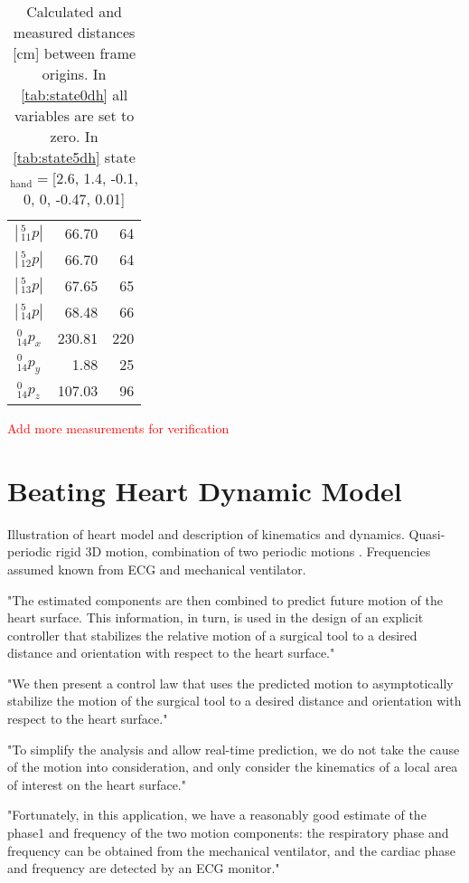 \begin{table}[htbp]
{\begin{tabular}{l r r}
		$|\,^5_{11} p|$ & 66.70 & 64\\
		$|\,^5_{12} p|$ & 66.70 & 64\\
		$|\,^5_{13} p|$ & 67.65 & 65\\
		$|\,^5_{14} p|$ & 68.48 & 66\\\hline
		$\,^0_{14} p_x$ & 230.81 & 220\\
		$\,^0_{14} p_y$ & 1.88 & 25\\
		$\,^0_{14} p_z$ & 107.03 & 96
	\end{tabular}
	\label{tab:state6dh}%
}\hfill
\caption{Calculated and measured distances [cm] between frame origins. In \autoref{tab:state0dh} all variables are set to zero. In \ref{tab:state5dh} state$_\text{hand}=$[2.6, 1.4, -0.1, 0, 0, -0.47, 0.01] }
\label{tab:DH_distances}
\end{table}

\textcolor{red}{Add more measurements for verification}





\section{Beating Heart Dynamic Model}
Illustration of heart model and description of kinematics and dynamics.
Quasi-periodic rigid 3D motion, combination of two periodic motions \cite{bib:heart_berkeley}. Frequencies assumed known from ECG and mechanical ventilator.

"The estimated components are then combined to predict future motion of the heart surface. This information, in turn, is used in the design of an explicit controller that stabilizes the relative motion of a surgical tool to a desired distance and orientation with respect to the heart surface."

"We then present a control law that uses the predicted motion to asymptotically stabilize the motion of the surgical tool to a desired distance and orientation with respect to the heart surface."

"To simplify the analysis and allow real-time prediction, we do not take the cause of the motion into consideration, and only consider the kinematics of a local area of interest on the heart surface."

"Fortunately, in this application, we have a reasonably good estimate of the phase1 and frequency of the two motion components: the respiratory phase and frequency can be obtained from the mechanical ventilator, and the cardiac phase and frequency are detected by an ECG monitor."


